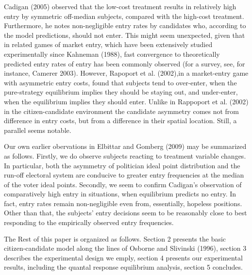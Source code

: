     Cadigan (2005) observed that the low-cost treatment results in relatively high entry by symmetric off-median subjects, compared with the high-cost treatment.  Furthermore, he notes non-negligible entry rates by candidates who, according to the model predictions, should not enter. This might seem unexpected, given that in related games of market entry, which have been extensively studied experimentally since Kahneman (1988), fast convergence to theoretically predicted entry rates of entry has been commonly observed (for a survey, see, for instance, Camerer 2003). However, Rapoport et al. (2002),in a market-entry game with asymmetric entry costs, found that subjects tend to over-enter, when the pure-strategy equilibrium implies they should be staying out, and under-enter, when the equilibrium implies they should enter. Unlike in Rappoport et al. (2002) in the citizen-candidate environment the candidate asymmetry comes not from difference in entry costs, but from a difference in their spatial location. Still, a parallel seems notable.
    
    Our own earlier obervations in Elbittar and Gomberg (2009) may be summarized as follows. Firstly, we do observe subjects reacting to treatment variable changes. In particular, both the asymmetry of politician ideal point distribution and the run-off electoral system are conducive to greater entry frequencies at the median of the voter ideal points. Secondly, we seem to confirm Cadigan's observation of comparatively high entry in situations, when equilibrium predicts no entry. In fact, entry rates remain non-negligible even from, essentially, hopeless positions. Other than that, the subjects' entry decisions seem to be reasonably close to best responding to the empirically observed entry frequencies.

The Rest of this paper is organized as follows. Section 2 presents the basic citizen-candidate model along the lines of Osborne and Slivinski (1996), section 3 describes the experimental design we emply, section 4 presents our experimental results, including the quantal response equilibrium analysis, section 5 concludes.





